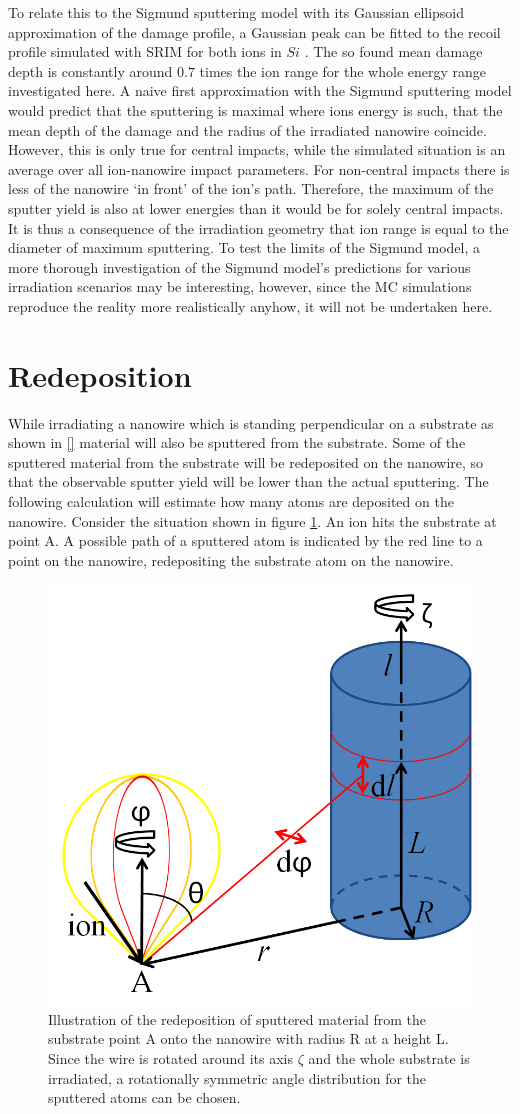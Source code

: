 To relate this to the Sigmund sputtering model with its Gaussian ellipsoid approximation of the damage profile, a Gaussian peak can be fitted to the recoil profile simulated with SRIM for both ions in $Si$ \cite{bobes_ion_2012}. The so found mean damage depth is constantly around $0.7$ times the ion range for the whole energy range investigated here. A naive first approximation with the Sigmund sputtering model would predict that the sputtering is maximal where ions energy is such, that the mean depth of the damage and the radius of the irradiated nanowire coincide. However, this is only true for central impacts, while the simulated situation is an average over all ion-nanowire impact parameters. For non-central impacts there is less of the nanowire `in front' of the ion's path. Therefore, the maximum of the sputter yield is also at lower energies than it would be for solely central impacts. It is thus a consequence of the irradiation geometry that ion range is equal to the diameter of maximum sputtering. To test the limits of the Sigmund model, a more thorough investigation of the Sigmund model's predictions for various irradiation scenarios may be interesting, however, since the MC simulations reproduce the reality more realistically anyhow, it will not be undertaken here.



\section{Redeposition}
\label{sec:redeposition}

While irradiating a nanowire which is standing perpendicular on a substrate as shown in \ref{} material will also be sputtered from the substrate. Some of the sputtered material from the substrate will be redeposited on the nanowire, so that the observable sputter yield will be lower than the actual sputtering. The following calculation will estimate how many atoms are deposited on the nanowire. Consider the situation shown in figure \ref{redeposit}. An ion hits the substrate at point A. A possible path of a sputtered atom is indicated by the red line to a point on the nanowire, redepositing the substrate atom on the nanowire. 

\begin{figure}
	\centering
		\includegraphics[width=.4\textwidth]{images/redeposit.jpg}
	\caption{Illustration of the redeposition of sputtered material from the substrate point A onto the nanowire with radius R at a height L. Since the wire is rotated around its axis $\zeta$ and the whole substrate is irradiated, a rotationally symmetric angle distribution for the sputtered atoms can be chosen.} 
	\label{redeposit}
\end{figure}

